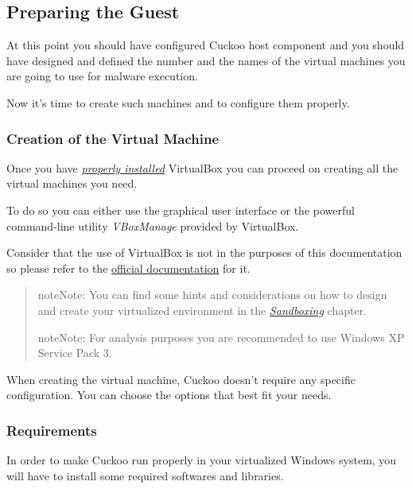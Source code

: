 \documentclass[letterpaper,10pt,english]{sphinxmanual}
\begin{document}
\subsection{Preparing the Guest}
\label{installation/guest/index::doc}\label{installation/guest/index:preparing-the-guest}
At this point you should have configured Cuckoo host component and you
should have designed and defined the number and the names of the virtual
machines you are going to use for malware execution.

Now it's time to create such machines and to configure them properly.


\subsubsection{Creation of the Virtual Machine}
\label{installation/guest/creation:creation-of-the-virtual-machine}\label{installation/guest/creation::doc}
Once you have {\hyperref[installation/host/requirements::doc]{\emph{properly installed}}} VirtualBox you
can proceed on creating all the virtual machines you need.

To do so you can either use the graphical user interface or the powerful
command-line utility \emph{VBoxManage} provided by VirtualBox.

Consider that the use of VirtualBox is not in the purposes of this documentation
so please refer to the \href{https://www.virtualbox.org/manual/UserManual.html}{official documentation} for it.
\begin{quote}

\begin{notice}{note}{Note:}
You can find some hints and considerations on how to design and create
your virtualized environment in the {\hyperref[introduction/sandboxing::doc]{\emph{Sandboxing}}}
chapter.
\end{notice}

\begin{notice}{note}{Note:}
For analysis purposes you are recommended to use Windows XP Service Pack
3.
\end{notice}
\end{quote}

When creating the virtual machine, Cuckoo doesn't require any specific
configuration. You can choose the options that best fit your needs.


\subsubsection{Requirements}
\label{installation/guest/requirements:requirements}\label{installation/guest/requirements::doc}
In order to make Cuckoo run properly in your virtualized Windows system, you
will have to install some required softwares and libraries.
\end{document}
